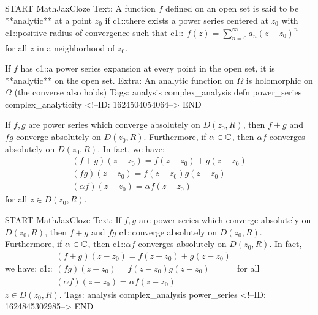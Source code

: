 \documentclass{memoir}
\begin{document}
\begin{anki}
START
MathJaxCloze
Text: A function \(f\) defined on an open set is said to be **analytic** at a point \(z_0\) if {{c1::there exists a power series centered at \(z_0\)}} with {{c1::positive radius of convergence}} such that
{{c1::\(\begin{align*}
        	f(z) = \sum_{n=0}^{\infty} a_n(z-z_0)^{n} 
        \end{align*}\)}}
for all \(z\) in a neighborhood of \(z_0\).

If \(f\) has {{c1::a power series expansion}} at every point in the open set, it is **analytic** on the open set.
Extra: An analytic function on \(\Omega\) is holomorphic on \(\Omega\) (the converse also holds)
Tags: analysis complex_analysis defn power_series complex_analyticity
<!--ID: 1624504054064-->
END
\end{anki}

\begin{prop}
	If \(f,g\) are power series which converge absolutely on \(D(z_0,R)\), then \(f+g\) and \(fg\) converge absolutely on \(D(z_0,R)\). Furthermore, if \(\alpha  \in \mathbb{C}\), then \(\alpha f\) converges absolutely on \(D(z_0,R)\). In fact, we have:
	\begin{align*}
		(f+g)(z-z_0) = f(z-z_0) + g(z-z_0)\\
		(fg)(z-z_0) = f(z-z_0)g(z-z_0)\\
		(\alpha f)(z-z_0) = \alpha f(z-z_0)
	\end{align*}
	for all \(z \in D(z_0,R)\).
\end{prop}

\begin{anki}
START
MathJaxCloze
Text: If \(f,g\) are power series which converge absolutely on \(D(z_0,R)\), then \(f+g\) and \(fg\) {{c1::converge absolutely on \(D(z_0,R)\)}}. Furthermore, if \(\alpha  \in \mathbb{C}\), then {{c1::\(\alpha f\)}} converges absolutely on \(D(z_0,R)\). In fact, we have:
 {{c1::\(\begin{align*}
         	(f+g)(z-z_0) = f(z-z_0) + g(z-z_0)\\
         	(fg)(z-z_0) = f(z-z_0)g(z-z_0)\\
         	(\alpha f)(z-z_0) = \alpha f(z-z_0)
         \end{align*}\)}} 
for all \(z \in D(z_0,R)\).
Tags: analysis complex_analysis power_series
<!--ID: 1624845302985-->
END
\end{anki}
\end{document}
